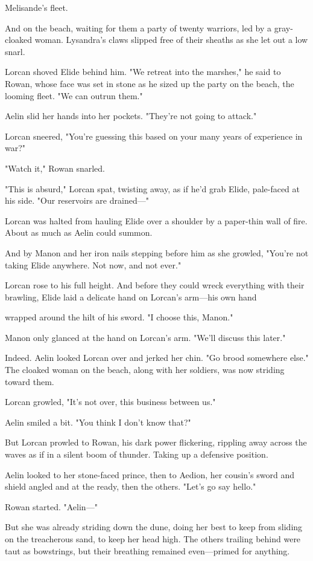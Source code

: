 Melisande's fleet.

And on the beach, waiting for them  a party of twenty warriors, led by a gray-cloaked woman. Lysandra's claws slipped free of their sheaths as she let out a low snarl.

Lorcan shoved Elide behind him. "We retreat into the marshes," he said to Rowan, whose face was set in stone as he sized up the party on the beach, the looming fleet. "We can outrun them."

Aelin slid her hands into her pockets. "They're not going to attack."

Lorcan sneered, "You're guessing this based on your many years of experience in war?"

"Watch it," Rowan snarled.

"This is absurd," Lorcan spat, twisting away, as if he'd grab Elide, pale-faced at his side. "Our reservoirs are drained---"

Lorcan was halted from hauling Elide over a shoulder by a paper-thin wall of fire. About as much as Aelin could summon.

And by Manon and her iron nails stepping before him as she growled, "You're not taking Elide anywhere. Not now, and not ever."

Lorcan rose to his full height. And before they could wreck everything with their brawling, Elide laid a delicate hand on Lorcan's arm---his own hand

wrapped around the hilt of his sword. "I choose this, Manon."

Manon only glanced at the hand on Lorcan's arm. "We'll discuss this later."

Indeed. Aelin looked Lorcan over and jerked her chin. "Go brood somewhere else." The cloaked woman on the beach, along with her soldiers, was now striding toward them.

Lorcan growled, "It's not over, this business between us."

Aelin smiled a bit. "You think I don't know that?"

But Lorcan prowled to Rowan, his dark power flickering, rippling away across the waves as if in a silent boom of thunder. Taking up a defensive position.

Aelin looked to her stone-faced prince, then to Aedion, her cousin's sword and shield angled and at the ready, then the others. "Let's go say hello."

Rowan started. "Aelin---"

But she was already striding down the dune, doing her best to keep from sliding on the treacherous sand, to keep her head high. The others trailing behind were taut as bowstrings, but their breathing remained even---primed for anything.

